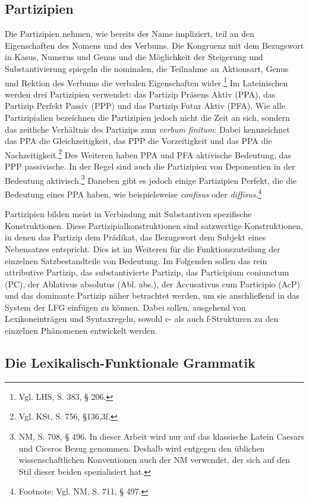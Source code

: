 \documentclass[12pt,a4paper]{article}
\begin{document}
\subsection{Partizipien}
Die Partizipien nehmen, wie bereits der Name impliziert, teil an den Eigenschaften des Nomens und des Verbums. Die Kongruenz mit dem Bezugswort in Kasus, Numerus und Genus und die Möglichkeit der Steigerung und Substantivierung spiegeln die nominalen, die Teilnahme an Aktionsart, Genus und Rektion des Verbums die verbalen Eigenschaften wider.\footnote{Vgl. LHS, S. 383, § 206.}
Im Lateinischen werden drei Partizipien verwendet: das Partizip Präsens Aktiv (PPA), das Partizip Perfekt Passiv (PPP) und das Partizip Futur Aktiv (PFA).
Wie alle Partizipialien bezeichnen die Partizipien jedoch nicht die Zeit an sich, sondern das zeitliche Verhältnis des Partizips zum \textit{verbum finitum}: Dabei kennzeichnet das PPA die Gleichzeitigkeit, das PPP die Vorzeitigkeit und das PPA die Nachzeitigkeit.\footnote{Vgl. KSt, S. 756, §136,3f.}
Des Weiteren haben PPA und PFA aktivische Bedeutung, das PPP passivische. In der Regel sind auch die Partizipien von Deponentien in der Bedeutung aktivisch.\footnote{NM, S. 708, § 496. In dieser Arbeit wird nur auf das klassische Latein Caesars und Ciceros Bezug genommen. Deshalb wird entgegen den üblichen wissenschaftlichen Konventionen auch der NM verwendet, der sich auf den Stil dieser beiden spezialisiert hat.} Daneben gibt es jedoch einige Partizipien Perfekt, die die Bedeutung eines PPA haben, wie beispielsweise \textit{confisus} oder \textit{diffisus}.\footnote{Footnote: Vgl. NM, S. 711, § 497.}

Partizipien bilden meist in Verbindung mit Substantiven spezifische Konstruktionen. 
Diese Partizipialkonstruktionen sind satzwertige Konstruktionen, in denen das Partizip dem Prädikat, das Bezugswort dem Subjekt eines Nebensatzes entspricht. Dies ist im Weiteren für die Funktionszuteilung der einzelnen Satzbestandteile von Bedeutung.
Im Folgenden sollen das rein attributive Partizip, das substantivierte Partizip, das Participium coniunctum (PC), der Ablativus absolutus (Abl. abs.), der Accusativus cum Participio (AcP) und das dominante Partizip näher betrachtet werden, um sie anschließend in das System der LFG einfügen zu können. Dabei sollen, ausgehend von Lexikoneinträgen und Syntaxregeln, sowohl c- als auch f-Strukturen zu den einzelnen Phänomenen entwickelt werden.
\subsection{Die Lexikalisch-Funktionale Grammatik}
\end{document}
